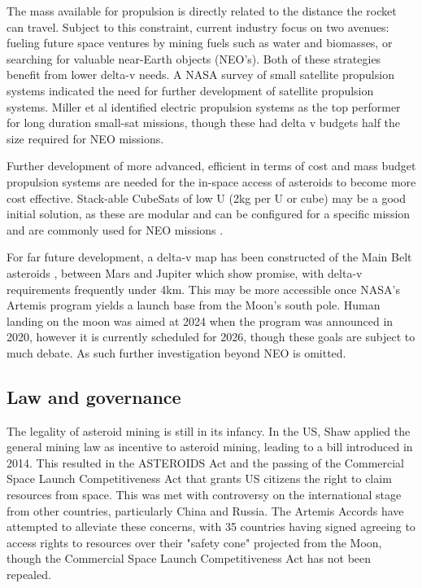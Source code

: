 \documentclass[conference]{IEEEtran}
\begin{document}
The mass available for propulsion is directly related to the distance the rocket can travel. Subject to this constraint, current industry focus on two avenues: fueling future space ventures by mining fuels such as water and biomasses, or searching for valuable near-Earth objects (NEO's). Both of these strategies benefit from lower delta-v needs. A NASA survey of small satellite propulsion systems \cite{parker-2016} indicated the need for further development of satellite propulsion systems. Miller et al \cite{Miller2021222} identified electric propulsion systems as the top performer for long duration small-sat missions, though these had delta v budgets half the size required for NEO missions. 

Further development of more advanced, efficient in terms of cost and mass budget propulsion systems are needed for the in-space access of asteroids to become more cost effective. Stack-able CubeSats of low U (2kg per U or cube) may be a good initial solution, as these are modular and can be configured for a specific mission and are commonly used for NEO missions \cite{aerospace4040058}.

For far future development, a delta-v map has been constructed of the Main Belt asteroids \cite{TAYLOR201873}, between Mars and Jupiter which show promise, with delta-v requirements frequently under 4km. This may be more accessible once NASA's Artemis program yields a launch base from the Moon's south pole. Human landing on the moon was aimed at 2024 when the program was announced in 2020, however it is currently scheduled for 2026, though these goals are subject to much debate. As such further investigation beyond NEO is omitted.

\subsection{Law and governance}\label{subsec:law}
The legality of asteroid mining is still in its infancy. In the US, Shaw \cite{shaw2013asteroids} applied the general mining law as incentive to asteroid mining, leading to a bill introduced in 2014. This resulted in the ASTEROIDS Act \cite{TRONCHETTI2014193} and the passing of the Commercial Space Launch Competitiveness Act that grants US citizens the right to claim resources from space. This was met with controversy on the international stage from other countries, particularly China and Russia. The Artemis Accords have attempted to alleviate these concerns, with 35 countries having signed agreeing to access rights to resources over their "safety cone" projected from the Moon, though the Commercial Space Launch Competitiveness Act has not been repealed. 
\end{document}

